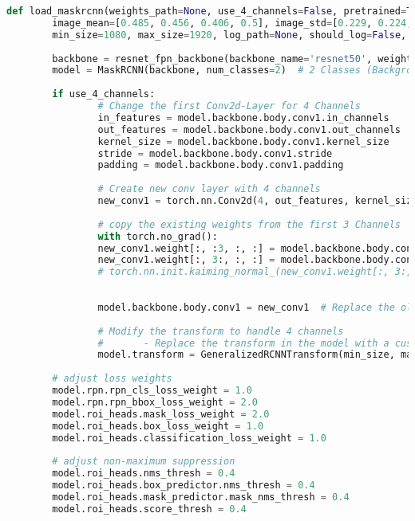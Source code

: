 		\begin{lstlisting}[language=Python,caption=Loading function of Mask R-CNN using torchvision, label=lst:model-loading]
def load_maskrcnn(weights_path=None, use_4_channels=False, pretrained=True,
		image_mean=[0.485, 0.456, 0.406, 0.5], image_std=[0.229, 0.224, 0.225, 0.5],    # from ImageNet
		min_size=1080, max_size=1920, log_path=None, should_log=False, should_print=True):
		
		backbone = resnet_fpn_backbone(backbone_name='resnet50', weights=ResNet50_Weights.IMAGENET1K_V2) # ResNet50_Weights.IMAGENET1K_V1)
		model = MaskRCNN(backbone, num_classes=2)  # 2 Classes (Background + 1 Object)
		
		if use_4_channels:
				# Change the first Conv2d-Layer for 4 Channels
				in_features = model.backbone.body.conv1.in_channels    # this have to be changed
				out_features = model.backbone.body.conv1.out_channels
				kernel_size = model.backbone.body.conv1.kernel_size
				stride = model.backbone.body.conv1.stride
				padding = model.backbone.body.conv1.padding
				
				# Create new conv layer with 4 channels
				new_conv1 = torch.nn.Conv2d(4, out_features, kernel_size=kernel_size, stride=stride, padding=padding)
				
				# copy the existing weights from the first 3 Channels
				with torch.no_grad():
				new_conv1.weight[:, :3, :, :] = model.backbone.body.conv1.weight  # Copy old 3 Channels
				new_conv1.weight[:, 3:, :, :] = model.backbone.body.conv1.weight[:, :1, :, :]  # Init new 4.th Channel with the one old channel
				# torch.nn.init.kaiming_normal_(new_conv1.weight[:, 3:, :, :], mode='fan_out', nonlinearity='relu')
				
				
				model.backbone.body.conv1 = new_conv1  # Replace the old Conv1 Layer with the new one
				
				# Modify the transform to handle 4 channels
				#       - Replace the transform in the model with a custom one
				model.transform = GeneralizedRCNNTransform(min_size, max_size, image_mean, image_std)
		
		# adjust loss weights
		model.rpn.rpn_cls_loss_weight = 1.0
		model.rpn.rpn_bbox_loss_weight = 2.0
		model.roi_heads.mask_loss_weight = 2.0
		model.roi_heads.box_loss_weight = 1.0
		model.roi_heads.classification_loss_weight = 1.0
		
		# adjust non-maximum suppression
		model.roi_heads.nms_thresh = 0.4
		model.roi_heads.box_predictor.nms_thresh = 0.4  
		model.roi_heads.mask_predictor.mask_nms_thresh = 0.4
		model.roi_heads.score_thresh = 0.4
		

\end{lstlisting}
